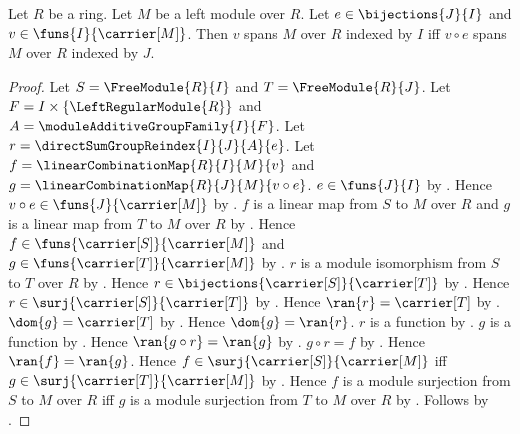 \begin{theorem}\label{indexed_module_spanning_reindex}
    Let $R$ be a ring.
    Let $M$ be a left module over $R$.
    Let $e\in\bijections{J}{I}$ and
        $v\in\funs{I}{\carrier[M]}$.
    Then $v$ spans $M$ over $R$ indexed by $I$ iff
        $v\circ e$ spans $M$ over $R$ indexed by $J$.
\end{theorem}
\begin{proof}
    Let $S=\FreeModule{R}{I}$ and $T=\FreeModule{R}{J}$.
    Let $F=I\times\{\LeftRegularModule{R}\}$ and
        $A=\moduleAdditiveGroupFamily{I}{F}$.
    Let $r=\directSumGroupReindex{I}{J}{A}{e}$.
    Let $f=\linearCombinationMap{R}{I}{M}{v}$ and
        $g=\linearCombinationMap{R}{J}{M}{v\circ e}$.
    $e\in\funs{J}{I}$ by .
    Hence $v\circ e\in\funs{J}{\carrier[M]}$ by
        .
    $f$ is a linear map from $S$ to $M$ over $R$ and
        $g$ is a linear map from $T$ to $M$ over $R$ by
        .
    Hence $f\in\funs{\carrier[S]}{\carrier[M]}$ and
        $g\in\funs{\carrier[T]}{\carrier[M]}$ by
        .
    $r$ is a module isomorphism from $S$ to $T$ over $R$ by
        .
    Hence $r\in\bijections{\carrier[S]}{\carrier[T]}$ by
        .
    Hence $r\in\surj{\carrier[S]}{\carrier[T]}$ by
        .
    Hence $\ran{r}=\carrier[T]$ by .
    $\dom{g}=\carrier[T]$ by .
    Hence $\dom{g}=\ran{r}$.
    $r$ is a function by .
    $g$ is a function by .
    Hence $\ran{g\circ r}=\ran{g}$ by .
    $g\circ r=f$ by .
    Hence $\ran{f}=\ran{g}$.
    Hence $f\in\surj{\carrier[S]}{\carrier[M]}$ iff
        $g\in\surj{\carrier[T]}{\carrier[M]}$ by
        .
    Hence $f$ is a module surjection from $S$ to $M$ over $R$ iff
        $g$ is a module surjection from $T$ to $M$ over $R$ by
        .
    Follows by .
\end{proof}

